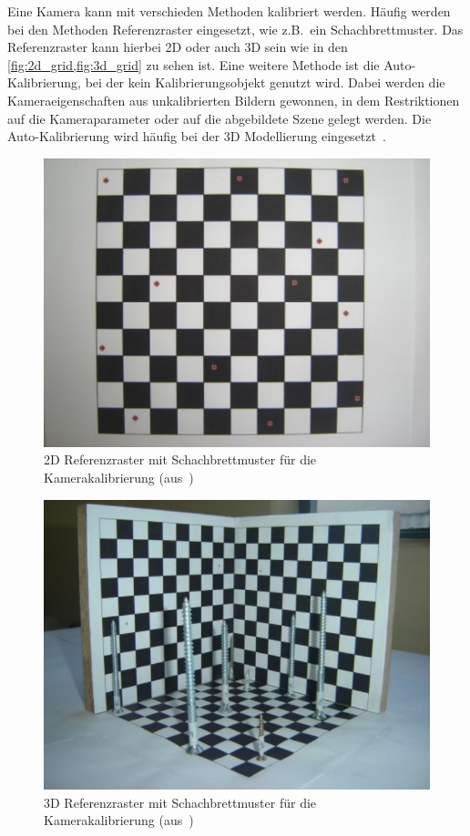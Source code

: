 Eine Kamera kann mit verschieden Methoden kalibriert werden.
Häufig werden bei den Methoden Referenzraster eingesetzt, wie z.B.\ ein Schachbrettmuster.
Das Referenzraster kann hierbei 2D oder auch 3D sein wie in den \cref{fig:2d_grid,fig:3d_grid} zu sehen ist.
Eine weitere Methode ist die Auto-Kalibrierung, bei der kein Kalibrierungsobjekt genutzt wird.
Dabei werden die Kameraeigenschaften aus unkalibrierten Bildern gewonnen, in dem Restriktionen auf die Kameraparameter oder auf die abgebildete Szene gelegt werden.
Die Auto-Kalibrierung wird häufig bei der 3D Modellierung eingesetzt~\cite{remondino_2005}.

\begin{figure}[h]
    \centering
    \includegraphics[width=\textwidth]{src/img/mendonca_2013_2d_grid.jpg}
    \caption{2D Referenzraster mit Schachbrettmuster für die Kamerakalibrierung (aus~\cite[Fig. 2]{mendonca_2013})}
    \label{fig:2d_grid}
\end{figure}



\begin{figure}[h]
    \centering
    \includegraphics[width=\textwidth]{src/img/mendonca_2013_3d_grid.jpg}
    \caption{3D Referenzraster mit Schachbrettmuster für die Kamerakalibrierung (aus~\cite[Fig. 4]{mendonca_2013})}
    \label{fig:3d_grid}
\end{figure}

